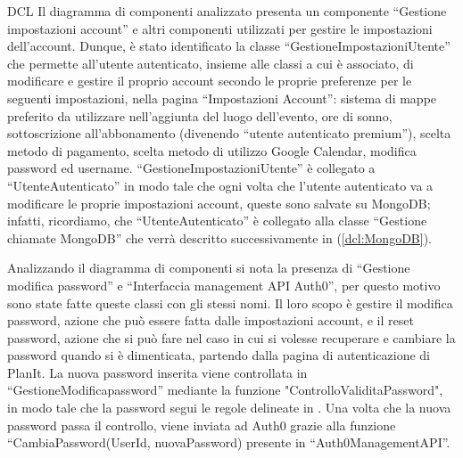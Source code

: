 \begin{listaPersonale}{DCL}
    Il diagramma di componenti analizzato presenta un componente “Gestione impostazioni account” e altri componenti utilizzati per gestire le impostazioni dell'account. Dunque, è stato identificato la classe “GestioneImpostazioniUtente” che permette all'utente autenticato, insieme alle classi a cui è associato, di modificare e gestire il proprio account secondo le proprie preferenze per le seguenti impostazioni, nella pagina “Impostazioni Account”: sistema di mappe preferito da utilizzare nell'aggiunta del luogo dell'evento, ore di sonno, sottoscrizione all'abbonamento (divenendo “utente autenticato premium”), scelta metodo di pagamento, scelta metodo di utilizzo Google Calendar, modifica password ed username.
    “GestioneImpostazioniUtente” è collegato a “UtenteAutenticato” in modo tale che ogni volta che l'utente autenticato va a modificare le proprie impostazioni account, queste sono salvate su MongoDB; infatti, ricordiamo, che “UtenteAutenticato” è collegato alla classe “Gestione chiamate MongoDB” che verrà descritto successivamente in (\ref{dcl:MongoDB}).


    \begin{center}
        
    \end{center}
    \newpage


    \begin{listaPersonale2}[DCL]{}

        Analizzando il diagramma di componenti si nota la presenza di “Gestione modifica password” e “Interfaccia management API Auth0”, per questo motivo sono state fatte queste classi con gli stessi nomi. Il loro scopo è gestire il modifica password, azione che può essere fatta dalle impostazioni account, e il reset password, azione che si può fare nel caso in cui si volesse recuperare e cambiare la password quando si è dimenticata, partendo dalla pagina di autenticazione di PlanIt. La nuova password inserita viene controllata in “GestioneModificapassword” mediante la funzione "ControlloValiditaPassword", in modo tale che la password segui le regole delineate in . Una volta che la nuova password passa il controllo, viene inviata ad Auth0 grazie alla funzione “CambiaPassword(UserId, nuovaPassword) presente in “Auth0ManagementAPI”.



\end{listaPersonale2}
\end{listaPersonale}
